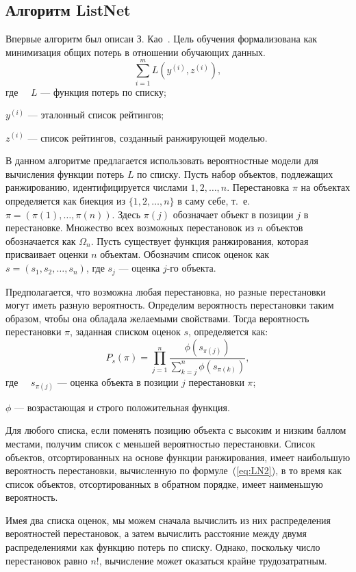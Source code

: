 \subsection{Алгоритм ListNet}
Впервые алгоритм был описан З. Као~\cite{ListNet}. Цель обучения формализована как минимизация общих потерь в отношении обучающих данных.
\begin{equation}
	\label{eq:LN1}
	\sum_{i=1}^m L(y^{(i)}, z^{(i)}),
\end{equation}
где ~~$L$ --- функция потерь по списку;

$y^{(i)}$ --- эталонный список рейтингов;

$z^{(i)}$ --- список рейтингов, созданный ранжирующей моделью.

В данном алгоритме предлагается использовать вероятностные модели для вычисления функции потерь $L$ по списку. Пусть набор объектов, подлежащих ранжированию, идентифицируется числами $1, 2, \dots, n$. Перестановка $\pi$ на объектах определяется как биекция из $\{1, 2, \dots, n\}$ в саму себе, т.~е. $\pi=(\pi(1), \dots, \pi(n))$. Здесь $\pi(j)$ обозначает объект в позиции $j$ в перестановке. Множество всех возможных перестановок из $n$ объектов обозначается как $\Omega_n$. Пусть существует функция ранжирования, которая присваивает
оценки $n$ объектам. Обозначим список оценок как $s = (s_1, s_2, \dots, s_n)$, где $s_j$ --- оценка $j$-го объекта. 

Предполагается, что возможна любая перестановка, но разные перестановки могут иметь разную вероятность. Определим вероятность перестановки таким образом, чтобы она обладала желаемыми свойствами. Тогда вероятность перестановки $\pi$, заданная списком оценок $s$, определяется как:
\begin{equation}
	\label{eq:LN2}
	P_s(\pi)=\prod_{j=1}^n \frac{\phi(s_{\pi(j)})}{\sum_{k=j}^n \phi(s_{\pi(k)})},
\end{equation}
где ~~$s_{\pi(j)}$ ---  оценка объекта в позиции $j$ перестановки $\pi$;

$\phi$ --- возрастающая и строго положительная функция.

Для любого списка, если поменять позицию объекта с высоким и низким баллом местами, получим список с меньшей вероятностью перестановки. Список объектов, отсортированных на основе функции ранжирования, имеет наибольшую вероятность перестановки, вычисленную по формуле~(\ref{eq:LN2}), в то время как список объектов, отсортированных в обратном порядке, имеет наименьшую вероятность.

Имея два списка оценок, мы можем сначала вычислить из них распределения вероятностей перестановок, а затем вычислить расстояние между двумя распределениями как функцию потерь по списку. Однако, поскольку число перестановок равно $n!$, вычисление может оказаться крайне трудозатратным.

